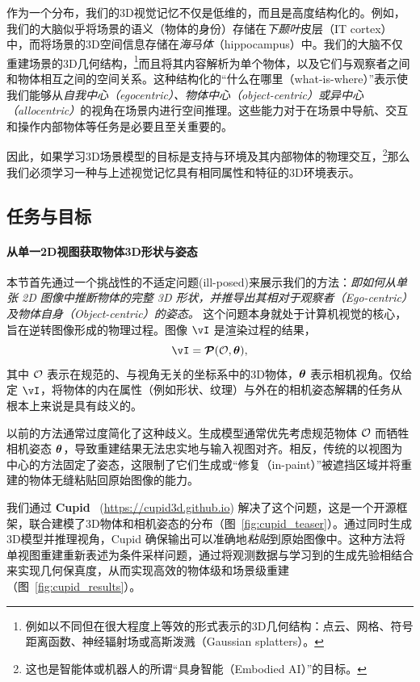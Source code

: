 \documentclass[../../book-main_zh.tex]{subfiles}
\begin{document}
作为一个分布，我们的3D视觉记忆不仅是低维的，而且是高度结构化的。例如，我们的大脑似乎将场景的语义（物体的身份）存储在{\em 下颞叶}皮层（IT cortex）中，而将场景的3D空间信息存储在{\em 海马体}（hippocampus）中。我们的大脑不仅重建场景的3D几何结构，\footnote{例如以不同但在很大程度上等效的形式表示的3D几何结构：点云、网格、符号距离函数、神经辐射场或高斯泼溅（Gaussian splatters）。}而且将其内容解析为单个物体，以及它们与观察者之间和物体相互之间的空间关系。这种结构化的“什么在哪里（what-is-where）”表示使我们能够从{\em 自我中心（egocentric）、物体中心（object-centric）或异中心（allocentric）}的视角在场景内进行空间推理。这些能力对于在场景中导航、交互和操作内部物体等任务是必要且至关重要的。

因此，如果学习3D场景模型的目标是支持与环境及其内部物体的物理交互，\footnote{这也是智能体或机器人的所谓“具身智能（Embodied AI）”的目标。}那么我们必须学习一种与上述视觉记忆具有相同属性和特征的3D环境表示。




\subsection{任务与目标}
\label{sub:cupid_objective}


\paragraph{从单一2D视图获取物体3D形状与姿态}
本节首先通过一个挑战性的不适定问题(ill-posed)来展示我们的方法：{\em 即如何从单张 2D 图像中推断物体的完整 3D 形状，并推导出其相对于观察者（Ego-centric）及物体自身（Object-centric）的姿态。} 这个问题本身就处于计算机视觉的核心，旨在逆转图像形成的物理过程。图像 $\image$ 是渲染过程的结果，
\[
\image = \render(\object, \pose),
\]
其中 $\mathcal{O}$ 表示在规范的、与视角无关的坐标系中的3D物体，$\boldsymbol{\theta}$ 表示相机视角。仅给定 $\image$，将物体的内在属性（例如形状、纹理）与外在的相机姿态解耦的任务从根本上来说是具有歧义的。


以前的方法通常过度简化了这种歧义。生成模型通常优先考虑规范物体 $\mathcal{O}$ 而牺牲相机姿态 $\boldsymbol{\theta}$，导致重建结果无法忠实地与输入视图对齐。相反，传统的以视图为中心的方法固定了姿态，这限制了它们生成或“修复（in-paint）”被遮挡区域并将重建的物体无缝粘贴回原始图像的能力。


我们通过 \textbf{Cupid}~\citep{huang2025cupid} (\url{https://cupid3d.github.io}) 解决了这个问题，这是一个开源框架，联合建模了3D物体和相机姿态的分布（图~\ref{fig:cupid_teaser}）。通过同时生成3D模型并推理视角，Cupid 确保输出可以准确地\textit{粘贴}到原始图像中。这种方法将单视图重建重新表述为条件采样问题，通过将观测数据与学习到的生成先验相结合来实现几何保真度，从而实现高效的物体级和场景级重建（图~\ref{fig:cupid_results}）。
\end{document}

